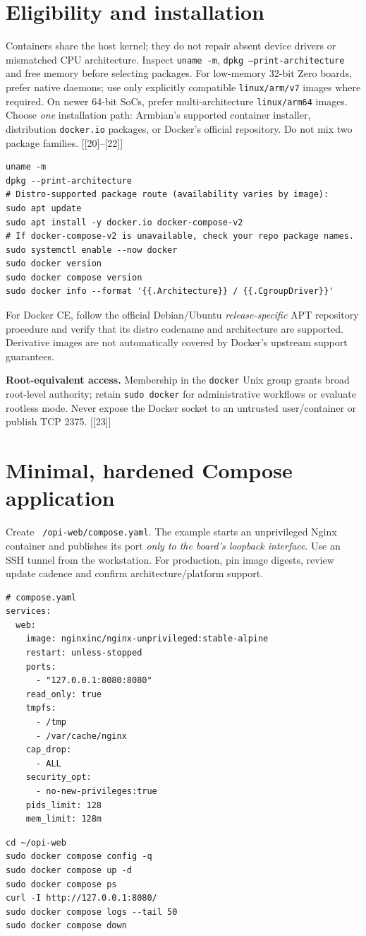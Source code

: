 \documentclass[10pt,oneside,openany]{report}
\newcommand{\code}[1]{\texttt{#1}}
\newcommand{\smallref}[1]{{\sffamily\scriptsize\color{slate}[#1]}}
\begin{document}
\section{Eligibility and installation}
Containers share the host kernel; they do not repair absent device drivers or mismatched CPU architecture. Inspect \code{uname -m}, \code{dpkg --print-architecture} and free memory before selecting packages. For low-memory 32-bit Zero boards, prefer native daemons; use only explicitly compatible \code{linux/arm/v7} images where required. On newer 64-bit SoCs, prefer multi-architecture \code{linux/arm64} images. Choose \emph{one} installation path: Armbian's supported container installer, distribution \code{docker.io} packages, or Docker's official repository. Do not mix two package families. \smallref{[20]--[22]}
\begin{lstlisting}[style=sh]
uname -m
dpkg --print-architecture
# Distro-supported package route (availability varies by image):
sudo apt update
sudo apt install -y docker.io docker-compose-v2
# If docker-compose-v2 is unavailable, check your repo package names.
sudo systemctl enable --now docker
sudo docker version
sudo docker compose version
sudo docker info --format '{{.Architecture}} / {{.CgroupDriver}}'
\end{lstlisting}
For Docker CE, follow the official Debian/Ubuntu \emph{release-specific} APT repository procedure and verify that its distro codename and architecture are supported. Derivative images are not automatically covered by Docker's upstream support guarantees.
\begin{cautionbox}
\textbf{Root-equivalent access.} Membership in the \code{docker} Unix group grants broad root-level authority; retain \code{sudo docker} for administrative workflows or evaluate rootless mode. Never expose the Docker socket to an untrusted user/container or publish TCP 2375. \smallref{[23]}
\end{cautionbox}
\section{Minimal, hardened Compose application}
Create \code{~/opi-web/compose.yaml}. The example starts an unprivileged Nginx container and publishes its port \emph{only to the board's loopback interface}. Use an SSH tunnel from the workstation. For production, pin image digests, review update cadence and confirm architecture/platform support.
\begin{lstlisting}[style=config]
# compose.yaml
services:
  web:
    image: nginxinc/nginx-unprivileged:stable-alpine
    restart: unless-stopped
    ports:
      - "127.0.0.1:8080:8080"
    read_only: true
    tmpfs:
      - /tmp
      - /var/cache/nginx
    cap_drop:
      - ALL
    security_opt:
      - no-new-privileges:true
    pids_limit: 128
    mem_limit: 128m
\end{lstlisting}
\begin{lstlisting}[style=sh]
cd ~/opi-web
sudo docker compose config -q
sudo docker compose up -d
sudo docker compose ps
curl -I http://127.0.0.1:8080/
sudo docker compose logs --tail 50
sudo docker compose down
\end{lstlisting}
\end{document}
